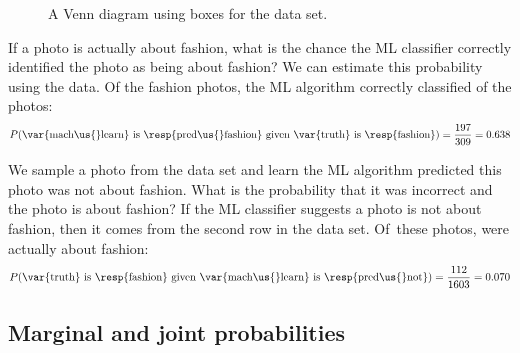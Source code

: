 \begin{figure}[ht]
  \centering
  \caption{A Venn diagram using boxes for the
       data set.}
  \label{photoClassifyVenn}
\end{figure}

\begin{examplewrap}
\begin{nexample}{If a photo is actually about fashion,
    what is the chance the ML classifier correctly identified
    the photo as being about fashion?}
  We can estimate this probability using the data.
  Of the \fashAY{} fashion photos,
  the ML algorithm correctly classified \fashYY{} of the photos:
\begin{align*}
P(\text{\var{mach\us{}learn} is \resp{pred\us{}fashion}
    given \var{truth} is \resp{fashion}})
  = \frac{\fashYY{}}{\fashAY{}}
  = 0.638
\end{align*}
\end{nexample}
\end{examplewrap}

\begin{examplewrap}
\begin{nexample}{We sample a photo from the data set
    and learn the ML algorithm predicted this photo
    was not about fashion.
    What is the probability that it was incorrect and
    the photo is about fashion?}
  If the ML classifier suggests a photo is not about fashion,
  then it comes from the second row in the data set.
  Of~these \fashNA{} photos, \fashNY{} were actually
  about fashion:
\begin{align*}
P(\text{\var{truth} is \resp{fashion}
    given \var{mach\us{}learn} is \resp{pred\us{}not}})
  = \frac{\fashNY{}}{\fashNA{}}
  = 0.070
\end{align*}
\end{nexample}
\end{examplewrap}


\D{\newpage}

%
\subsection{Marginal and joint probabilities}
\label{marginalAndJointProbabilities}


